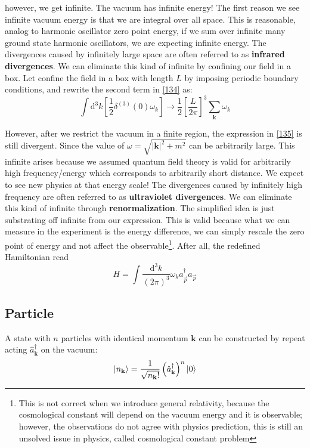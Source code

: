 \documentclass[12pt]{article}
\numberwithin{equation}{section}
\theoremstyle{1style}
\newcommand{\tbf}[1]{\textbf{#1}}
\newcommand{\id}{\mathrm{d}}
\begin{document}
however, we get infinite.
The vacuum has infinite energy!
The first reason we see infinite vacuum energy is that we are integral over all space. This is reasonable, analog
to harmonic oscillator zero point energy,
if we sum over infinite many ground state harmonic oscillators, we are expecting infinite energy.
The divergences caused by infinitely large space are often referred to as \tbf{infrared divergences}.
We can eliminate this kind of infinite by confining our field in a box.
Let confine the field in a box with length \(L\) by imposing periodic boundary conditions, and rewrite the second term in \ref{134} as:
\begin{equation}\label{135}
  \int \id^{3}k\left[\frac{1}{2}\delta^{(3)}(0)\omega_{k}\right]\rightarrow\frac{1}{2}\left[\frac{L}{2\pi}\right]^{3}\sum_{\mathbf{k}}\omega_{k}
\end{equation}

However, after we restrict the vacuum in a finite region, the expression in \ref{135} is still divergent.
Since the value of \(\omega=\sqrt{|\mathbf{k}|^2+m^2}\) can be arbitrarily large.
This infinite arises because we assumed quantum field theory is valid for arbitrarily high frequency/energy
which corresponds to arbitrarily short distance. We expect to see new physics at that energy scale!
The divergences caused by infinitely high frequency are often referred to as \tbf{ultraviolet divergences}.
We can eliminate this kind of infinite through \tbf{renormalization}.
The simplified idea is just substrating off infinite from our expression.
This is valid because what we can measure in the experiment is the energy difference,
we can simply rescale the zero point of energy and not affect the observable\footnote{This is not correct when we introduce general relativity,
  because the cosmological constant will depend on the vacuum energy and it is observable; however,
  the observations do not agree with physics prediction,
  this is still an unsolved issue in physics, called cosmological constant problem}.
After all, the redefined Hamiltonian read
\begin{equation}
  H=\int\frac{\id^3k}{(2\pi)^3}\omega_{k}a_{\vec{p}}^{\dagger}a_{\vec{p}}
\end{equation}

\subsection{Particle}

A state with \(n\) particles with identical momentum \(\mathbf{k}\) can be constructed by repeat acting \(\hat{a}^{\dagger}_{\mathbf{k}}\)
on the vacuum:
\begin{equation}
  \ket{n_{\mathbf{k}}}=\frac{1}{\sqrt{n_{\mathbf{k}}!}}\left(\hat{a}^{\dagger}_{\mathbf{k}}\right)^{n}\ket{0}
\end{equation}
\end{document}
